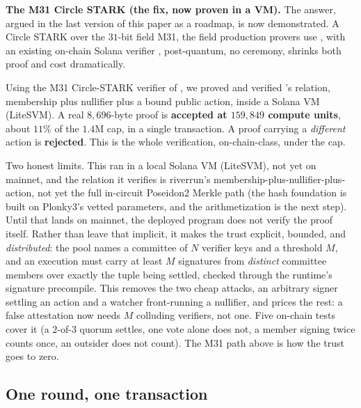 \documentclass[11pt]{article}
\begin{document}
\textbf{The M31 Circle STARK (the fix, now proven in a VM).} The answer, argued in the
last version of this paper as a roadmap, is now demonstrated. A Circle STARK over the
$31$-bit field M31, the field production provers use \cite{stwo}, with an existing
on-chain Solana verifier \cite{murkl}, post-quantum, no ceremony, shrinks both proof and
cost dramatically.

\begin{measured}
Using the M31 Circle-STARK verifier of \cite{murkl}, we proved and verified \river's
relation, membership plus nullifier plus a bound public action, inside a Solana VM
(LiteSVM). A real $8{,}696$-byte proof is \textbf{accepted at $159{,}849$ compute
units}, about $11\%$ of the $1.4$M cap, in a single transaction. A proof carrying a
\emph{different} action is \textbf{rejected}. This is the whole verification,
on-chain-class, under the cap.
\end{measured}

\begin{honest}
Two honest limits. This ran in a local Solana VM (LiteSVM), not yet on mainnet, and the
relation it verifies is riverrun's membership-plus-nullifier-plus-action, not yet the
full in-circuit Poseidon2 Merkle path (the hash foundation is built on Plonky3's vetted
parameters, and the arithmetization is the next step). Until that lands on mainnet, the
deployed program does not verify the proof itself. Rather than leave that implicit, it
makes the trust explicit, bounded, and \emph{distributed}: the pool names a committee of
$N$ verifier keys and a threshold $M$, and an execution must carry at least $M$
signatures from \emph{distinct} committee members over exactly the tuple being settled,
checked through the runtime's signature precompile. This removes the two cheap attacks,
an arbitrary signer settling an action and a watcher front-running a nullifier, and
prices the rest: a false attestation now needs $M$ colluding verifiers, not one. Five
on-chain tests cover it (a $2$-of-$3$ quorum settles, one vote alone does not, a member
signing twice counts once, an outsider does not count). The M31 path above is how the
trust goes to zero.
\end{honest}

\subsection{One round, one transaction}
\label{sub:batch}
\end{document}
